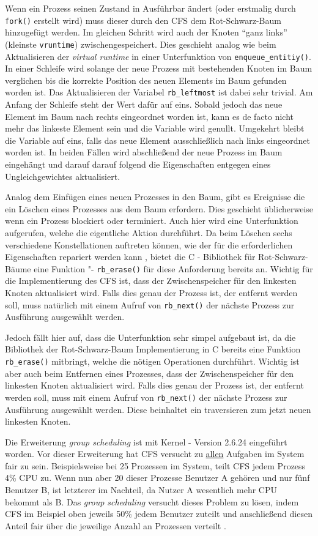 Wenn ein Prozess seinen Zustand in Ausführbar ändert (oder erstmalig durch \texttt{fork()} erstellt wird) muss dieser durch den CFS dem Rot-Schwarz-Baum hinzugefügt werden. Im gleichen Schritt wird auch der Knoten ``ganz links'' (kleinste \texttt{vruntime}) zwischengespeichert. Dies geschieht analog wie beim Aktualisieren der \textit{virtual runtime} in einer Unterfunktion von \texttt{enqueue\_entitiy()}. In einer Schleife wird solange der neue Prozess mit bestehenden Knoten im Baum verglichen bis die korrekte Position des neuen Elements im Baum gefunden worden ist. Das Aktualisieren der Variabel \texttt{rb\_leftmost} ist dabei sehr trivial. Am Anfang der Schleife steht der Wert dafür auf eins. Sobald jedoch das neue Element im Baum nach rechts eingeordnet worden ist, kann es de facto nicht mehr das linkeste Element sein und die Variable wird genullt. Umgekehrt bleibt die Variable auf eins, falls das neue Element ausschließlich nach links eingeordnet worden ist. 
In beiden Fällen wird abschließend der neue Prozess im Baum eingehängt und darauf darauf folgend die Eigenschaften entgegen eines Ungleichgewichtes aktualisiert.

Analog dem Einfügen eines neuen Prozesses in den Baum, gibt es Ereignisse die ein Löschen eines Prozesses aus dem Baum erfordern. Dies geschieht üblicherweise wenn ein Prozess blockiert oder terminiert. Auch hier wird eine Unterfunktion aufgerufen, welche die eigentliche Aktion durchführt.
Da beim Löschen sechs verschiedene Konstellationen auftreten können, wie der für die erforderlichen Eigenschaften repariert werden kann \cite{tcormen}, bietet die C - Bibliothek für Rot-Schwarz-Bäume eine Funktion "- \texttt{rb\_erase()} für diese Anforderung bereits an. Wichtig für die Implementierung des CFS ist, dass der Zwischenspeicher für den linkesten Knoten aktualisiert wird. Falls dies genau der Prozess ist, der entfernt werden soll, muss natürlich mit einem Aufruf von \texttt{rb\_next()} der nächste Prozess zur Ausführung ausgewählt werden. 

Jedoch fällt hier auf, dass die Unterfunktion sehr simpel aufgebaut ist, da die Bibliothek der Rot-Schwarz-Baum Implementierung in C bereits eine Funktion \texttt{rb\_erase()} mitbringt, welche die nötigen Operationen durchführt. Wichtig ist aber auch beim Entfernen eines Prozesses, dass der Zwischenspeicher für den linkesten Knoten aktualisiert wird. Falls dies genau der Prozess ist, der entfernt werden soll, muss mit einem Aufruf von \texttt{rb\_next()} der nächste Prozess zur Ausführung ausgewählt werden. Diese beinhaltet ein traversieren zum jetzt neuen linkesten Knoten.

Die Erweiterung \textit{group scheduling} ist mit Kernel - Version 2.6.24 eingeführt worden. Vor dieser Erweiterung hat CFS versucht zu \underline{allen} Aufgaben im System fair zu sein. Beispielsweise bei 25 Prozessen im System, teilt CFS jedem Prozess 4\% CPU zu. Wenn nun aber 20 dieser Prozesse Benutzer A gehören und nur fünf Benutzer B, ist letzterer im Nachteil, da Nutzer A wesentlich mehr CPU bekommt als B. Das \textit{group scheduling} versucht dieses Problem zu lösen, indem CFS im Beispiel oben jeweils 50\% jedem Benutzer zuteilt und anschließend diesen Anteil fair über die jeweilige Anzahl an Prozessen verteilt \cite{cpabla}. 
